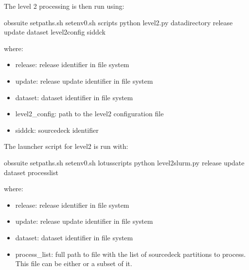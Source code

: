 \documentclass[letterpaper,10pt,english]{sphinxmanual}
\begin{document}
The level 2 processing is then run using:

\begin{sphinxVerbatim}[commandchars=\\\{\}]
 obs\PYGZhy{}suite
 setpaths.sh
 setenv0.sh
 scripts
python level2.py data\PYGZus{}directory release update dataset level2\PYGZus{}config sid\PYGZhy{}dck
\end{sphinxVerbatim}

where:
\begin{itemize}
\item {} 
release: release identifier in file system

\item {} 
update: release update identifier in file system

\item {} 
dataset: dataset identifier in file system

\item {} 
level2\_config: path to the level2 configuration file

\item {} 
sid\sphinxhyphen{}dck: source\sphinxhyphen{}deck identifier

\end{itemize}

The launcher script for level2 is run with:

\begin{sphinxVerbatim}[commandchars=\\\{\}]
 obs\PYGZhy{}suite
 setpaths.sh
 setenv0.sh
 lotus\PYGZus{}scripts
python level2\PYGZus{}slurm.py release update dataset  process\PYGZus{}list
\end{sphinxVerbatim}

where:
\begin{itemize}
\item {} 
release: release identifier in file system

\item {} 
update: release update identifier in file system

\item {} 
dataset: dataset identifier in file system

\item {} 
process\_list: full path to file with the list of source\sphinxhyphen{}deck partitions to
process. This file can be either {\hyperref[\detokenize{index:process-list-file}]{}} or a subset of it.

\end{itemize}
\end{document}
